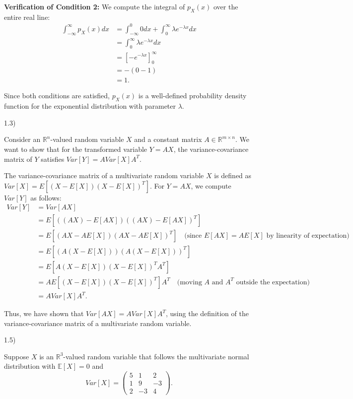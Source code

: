 \documentclass{article}
\begin{document}
\textbf{Verification of Condition 2:}
We compute the integral of \(p_X(x)\) over the entire real line:
\begin{align*}
\int_{-\infty}^{\infty} p_X(x) dx &= \int_{-\infty}^{0} 0 dx + \int_{0}^{\infty} \lambda e^{-\lambda x} dx \\
&= \int_{0}^{\infty} \lambda e^{-\lambda x} dx \\
&= \left[ -e^{-\lambda x} \right]_{0}^{\infty} \\
&= -(0 - 1) \\
&= 1.
\end{align*}

Since both conditions are satisfied, \(p_X(x)\) is a well-defined probability density function for the exponential distribution with parameter \(\lambda\).

1.3)

Consider an \(\mathbb{R}^n\)-valued random variable \(X\) and a constant matrix \(A \in \mathbb{R}^{m \times n}\). We want to show that for the transformed variable \(Y = AX\), the variance-covariance matrix of \(Y\) satisfies \(Var[Y] = A Var[X]A^T\).

The variance-covariance matrix of a multivariate random variable \(X\) is defined as \(Var[X] = E[(X - E[X])(X - E[X])^T]\). For \(Y = AX\), we compute \(Var[Y]\) as follows:
\begin{align*}
Var[Y] &= Var[AX] \\
       &= E[((AX) - E[AX])((AX) - E[AX])^T] \\
       &= E[(AX - AE[X])(AX - AE[X])^T] \quad \text{(since \(E[AX] = AE[X]\) by linearity of expectation)} \\
       &= E[(A(X - E[X]))(A(X - E[X]))^T] \\
       &= E[A(X - E[X])(X - E[X])^T A^T] \\
       &= A E[(X - E[X])(X - E[X])^T] A^T \quad \text{(moving \(A\) and \(A^T\) outside the expectation)} \\
       &= A Var[X] A^T.
\end{align*}

Thus, we have shown that \(Var[AX] = A Var[X]A^T\), using the definition of the variance-covariance matrix of a multivariate random variable.

1.5)

Suppose \(X\) is an \(\mathbb{R}^3\)-valued random variable that follows the multivariate normal distribution with \(\mathbb{E}[X] = 0\) and
\[ Var[X] = \begin{pmatrix}
5 & 1 & 2 \\
1 & 9 & -3 \\
2 & -3 & 4
\end{pmatrix}. \]
\end{document}
